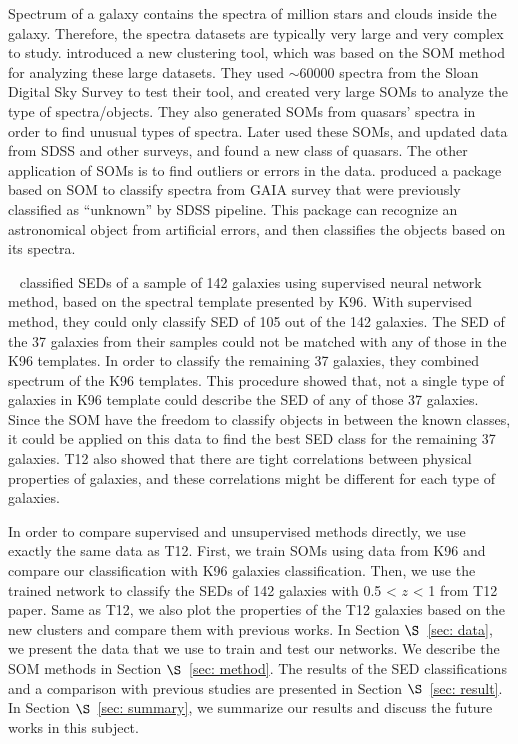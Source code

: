 Spectrum of a galaxy contains the spectra of million stars and clouds inside the galaxy.
Therefore, the spectra datasets are typically very large and very complex to study. %
\citet{In12} introduced a new clustering tool, which was based on the SOM method for analyzing these large datasets.
They used $\sim 60000$ spectra from the Sloan Digital Sky Survey \citep[SDSS;][]{Abazajian09} to test their tool, and created very large SOMs to analyze the type of spectra/objects.
They also generated SOMs from quasars' spectra in order to find unusual types of spectra. 
Later \citet{Meusinger16} used these SOMs, and updated data from SDSS and other surveys, and found a new class of quasars.
The other application of SOMs is to find outliers or errors in the data.
\citet{Fustes13} produced a package based on SOM to classify spectra from GAIA survey that were previously classified as ``unknown'' by SDSS pipeline. This package can recognize an astronomical object from artificial errors, and then classifies the objects based on its spectra.

~\citet[][hereafter T12]{Hossein12} classified SEDs of a sample of 142 galaxies using supervised neural network method, based on the spectral template presented by K96.
With supervised method, they could only classify SED of 105 out of the 142 galaxies.
The SED of the 37 galaxies from their samples could not be matched with any of those in the K96 templates. 
In order to classify the remaining 37 galaxies, they combined spectrum of the K96 templates.
This procedure showed that, not a single type of galaxies in K96 template could describe the SED of any of those 37 galaxies.
Since the SOM have the freedom to classify objects in between the known classes, it could be applied on this data to find the best SED class for the remaining 37 galaxies.
T12 also showed that there are tight correlations between physical properties of galaxies, and these correlations might be different for each type of galaxies.

In order to compare supervised and unsupervised methods directly, we use exactly the same data as T12.  
First, we train SOMs using data from K96 and compare our classification with K96 galaxies classification.
Then, we use the trained network to classify the SEDs of 142 galaxies with 0.5 < $z$ < 1 from T12 paper.
Same as T12, we also plot the properties of the T12 galaxies based on the new clusters and compare them with previous works.
In Section $\S$~\ref{sec: data}, we present the data that we use to train and test our networks. 
We describe the SOM methods in Section $\S$~\ref{sec: method}. 
The results of the SED classifications and a comparison with previous studies are presented in Section $\S$~\ref{sec: result}. 
In Section $\S$~\ref{sec: summary}, we summarize our results and discuss the future works in this subject.
